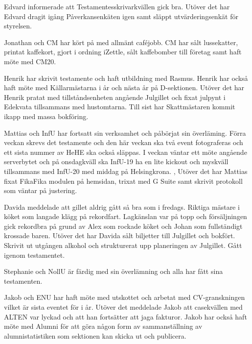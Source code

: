 \documentclass[10pt]{article}
\begin{document}
\begin{paragrafer}
\begin{fyllnadsval}
\end{fyllnadsval}

\begin{paragrafer}


Edvard informerade att Testamentesskrivarkvällen gick bra. Utöver det har Edvard dragit igång Påverkansenkäten igen samt släppt utvärderingsenkät för styrelsen. 

Jonathan och CM har kört på med allmänt caféjobb. CM har sålt lussekatter, printat kaffekort, gjort i ordning iZettle, sålt kaffebomber till företag samt haft möte med CM20. 

Henrik har skrivit testamente och haft utbildning med Rasmus. Henrik har också haft möte med Källarmästarna i år och nästa år på D-sektionen. Utöver det har Henrik pratat med tillståndsenheten angående Julgillet och fixat julpynt i Edekvata tillsammans med hustomtarna. 
Till sist har Skattmästaren kommit ikapp med massa bokföring. 

Mattias och InfU har fortsatt sin verksamhet och påbörjat sin överläming. Förra veckan skrevs det testamente och den här veckan ska två event fotograferas och ett sista nummer av HeHE ska också släppas. 
I veckan väntar ett möte angående serverbytet och på onsdagkväll ska InfU-19 ha en lite kickout och myskväll tillsammans med InfU-20 med middag på Helsingkrona. ,
Utöver det har Mattias fixat FikaFika modulen på hemsidan, trixat med G Suite samt skrivit protokoll som väntar på justering. 

Davida meddelade att gillet aldrig gått så bra som i fredags. Riktiga mästare i köket som langade klägg på rekordfart. Lagkänslan var på topp och försäljningen gick rekordbra på grund av Alex som rockade köket och Johan som fullständigt krossade baren. 
Utöver det har Davida sålt biljetter till Julgillet och bokfört. Skrivit ut utgången alkohol och strukturerat upp planeringen av Julgillet. Gått igenom testamentet. 

Stephanie och NollU är färdig med sin överlämning och alla har fått sina testamenten. 

Jakob och ENU har haft möte med utskottet och arbetat med CV-granskningen vilket är sista eventet för i år. Utöver det meddelade Jakob att casekvällen med ALTEN var lyckad och att han fortsätter att jaga fakturor. Jakob har också haft möte med Alumni för att göra någon form av sammanställning av alumnistatistiken som sektionen kan skicka ut och publicera. 


\end{paragrafer}
\end{paragrafer}
\end{document}
